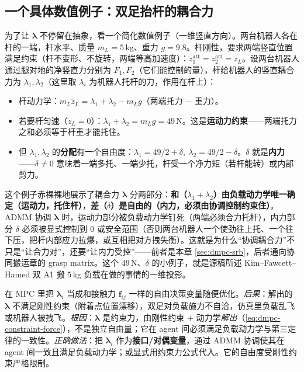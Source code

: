 \subsection{一个具体数值例子：双足抬杆的耦合力}
\label{sec:dmpc-srb-example}

为了让 $\boldsymbol{\lambda}$ 不停留在抽象，看一个简化数值例子（一维竖直方向）。两台机器人各在杆的一端，杆水平、质量 $m_L=5$\,kg、重力 $g=9.8$。杆刚性，要求两端竖直位置满足约束（杆不变形、不旋转，两端等高加速度）：$\ddot z_1^{\text{att}}=\ddot z_2^{\text{att}}=\ddot z_L$。设两台机器人通过腿对地的净竖直力分别为 $F_1,F_2$（它们能控制的量），杆给机器人的竖直耦合力为 $\lambda_1,\lambda_2$（这里取 $\lambda_i$ 为机器人托杆的力，作用在杆上）：
\begin{itemize}
  \item 杆动力学：$m_L\ddot z_L=\lambda_1+\lambda_2-m_L g$（两端托力 $-$ 重力）。
  \item 若要杆匀速（$\ddot z_L=0$）：$\lambda_1+\lambda_2=m_L g=49$\,N。这是\textbf{运动力约束}——两端托力之和必须等于杆重才能托住。
  \item 但 $\lambda_1,\lambda_2$ 的\textbf{分配}有一个自由度：$\lambda_1=49/2+\delta,\ \lambda_2=49/2-\delta$。$\delta$ 就是\textbf{内力}——$\delta\ne0$ 意味着一端多托、一端少托，杆受一个净力矩（若杆能转）或内部剪力。
\end{itemize}

\begin{insight}[耦合力 $=$ 运动力（和，唯一确定）$+$ 内力（差，必须受控）]\label{ins:dmpc-motion-internal}
这个例子赤裸裸地展示了耦合力 $\boldsymbol{\lambda}$ 分两部分：\textbf{和（$\lambda_1+\lambda_2$）由负载动力学唯一确定（运动力，托住杆）}，\textbf{差（$\delta$）是自由的（内力，必须由协调控制约束住）}。ADMM 协调 $\boldsymbol{\lambda}$ 时，运动力部分被负载动力学钉死（两端必须合力托杆），内力部分 $\delta$ 必须被显式控制到 $0$ 或安全范围（否则两台机器人一个使劲往上托、一个往下压，把杆内部应力拉爆，或互相把对方拽失衡）。这就是为什么“协调耦合力”不只是“让合力对”，还要“让内力受控”——前者是本章 \cref{sec:dmpc-srb}，后者通向协同搬运章的 grasp matrix。这个 $49$\,N、$\delta$ 的小例子，就是源稿所述 Kim--Fawcett--Hamed 双 A1 搬 $5$\,kg 负载在做的事情的一维投影。
\end{insight}

\begin{pitfall}
在 MPC 里把 $\boldsymbol{\lambda}_i$ 当成和接触力 $\mathbf{f}_{ij}$ 一样的自由决策变量随便优化。\emph{后果}：解出的 $\boldsymbol{\lambda}$ 不满足刚性约束（附着点位置漂移），双足对负载施力不自洽，仿真里负载乱飞或机器人被拽飞。\emph{根因}：$\boldsymbol{\lambda}$ 是约束力，由刚性约束 $+$ 动力学\emph{解出}（\cref{eq:dmpc-constraint-force}），不是独立自由量；它在 agent 间必须满足负载动力学与第三定律的一致性。\emph{正确做法}：把 $\boldsymbol{\lambda}_i$ 作为\textbf{接口/对偶变量}，通过 ADMM 协调使其在 agent 间一致且满足负载动力学；或显式用约束力公式代入。它的自由度受刚性约束严格限制。
\end{pitfall}

